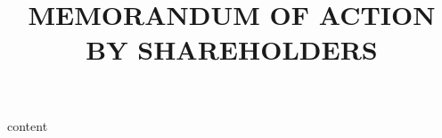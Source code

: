 \documentclass[12pt]{scrartcl}
\title{MEMORANDUM OF ACTION\\BY SHAREHOLDERS}
\begin{document}
\maketitle
{content}
\end{document}

